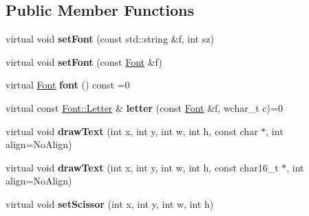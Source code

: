\subsection*{Public Member Functions}
\begin{DoxyCompactItemize}
\item 
\hypertarget{class_tempest_1_1_paint_text_engine_a29078c7c577270d71a7a88eff211f0df}{virtual void {\bfseries set\+Font} (const std\+::string \&f, int sz)}\label{class_tempest_1_1_paint_text_engine_a29078c7c577270d71a7a88eff211f0df}

\item 
\hypertarget{class_tempest_1_1_paint_text_engine_a63add179610603ace379c8bb5baf1c7b}{virtual void {\bfseries set\+Font} (const \hyperlink{class_tempest_1_1_font}{Font} \&f)}\label{class_tempest_1_1_paint_text_engine_a63add179610603ace379c8bb5baf1c7b}

\item 
\hypertarget{class_tempest_1_1_paint_text_engine_a886d9cbc9865f59fb02cfd70d1866bf1}{virtual \hyperlink{class_tempest_1_1_font}{Font} {\bfseries font} () const =0}\label{class_tempest_1_1_paint_text_engine_a886d9cbc9865f59fb02cfd70d1866bf1}

\item 
\hypertarget{class_tempest_1_1_paint_text_engine_ac2401f281fea8fe033ac4c8194b04a5c}{virtual const \hyperlink{struct_tempest_1_1_font_element_1_1_letter}{Font\+::\+Letter} \& {\bfseries letter} (const \hyperlink{class_tempest_1_1_font}{Font} \&f, wchar\+\_\+t c)=0}\label{class_tempest_1_1_paint_text_engine_ac2401f281fea8fe033ac4c8194b04a5c}

\item 
\hypertarget{class_tempest_1_1_paint_text_engine_a796fd8019fdd84b1f1595390332d600d}{virtual void {\bfseries draw\+Text} (int x, int y, int w, int h, const char $\ast$, int align=No\+Align)}\label{class_tempest_1_1_paint_text_engine_a796fd8019fdd84b1f1595390332d600d}

\item 
\hypertarget{class_tempest_1_1_paint_text_engine_ad9c74893b19a93fc30c1fd26c8f7ad4f}{virtual void {\bfseries draw\+Text} (int x, int y, int w, int h, const char16\+\_\+t $\ast$, int align=No\+Align)}\label{class_tempest_1_1_paint_text_engine_ad9c74893b19a93fc30c1fd26c8f7ad4f}

\item 
\hypertarget{class_tempest_1_1_paint_text_engine_a0c2842cf929e3ffc58fed981671c6af7}{virtual void {\bfseries set\+Scissor} (int x, int y, int w, int h)}\label{class_tempest_1_1_paint_text_engine_a0c2842cf929e3ffc58fed981671c6af7}


\end{DoxyCompactItemize}
